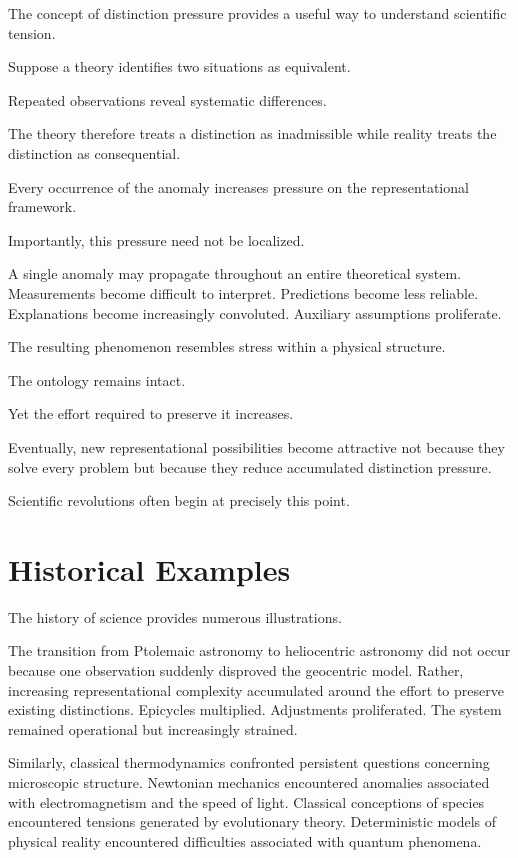 \documentclass[11pt,oneside,openany]{book}
\begin{document}
The concept of distinction pressure provides a useful way to understand scientific tension.

Suppose a theory identifies two situations as equivalent.

Repeated observations reveal systematic differences.

The theory therefore treats a distinction as inadmissible while reality treats the distinction as consequential.

Every occurrence of the anomaly increases pressure on the representational framework.

Importantly, this pressure need not be localized.

A single anomaly may propagate throughout an entire theoretical system. Measurements become difficult to interpret. Predictions become less reliable. Explanations become increasingly convoluted. Auxiliary assumptions proliferate.

The resulting phenomenon resembles stress within a physical structure.

The ontology remains intact.

Yet the effort required to preserve it increases.

Eventually, new representational possibilities become attractive not because they solve every problem but because they reduce accumulated distinction pressure.

Scientific revolutions often begin at precisely this point.

\section{Historical Examples}

The history of science provides numerous illustrations.

The transition from Ptolemaic astronomy to heliocentric astronomy did not occur because one observation suddenly disproved the geocentric model. Rather, increasing representational complexity accumulated around the effort to preserve existing distinctions. Epicycles multiplied. Adjustments proliferated. The system remained operational but increasingly strained.

Similarly, classical thermodynamics confronted persistent questions concerning microscopic structure. Newtonian mechanics encountered anomalies associated with electromagnetism and the speed of light. Classical conceptions of species encountered tensions generated by evolutionary theory. Deterministic models of physical reality encountered difficulties associated with quantum phenomena.
\end{document}
